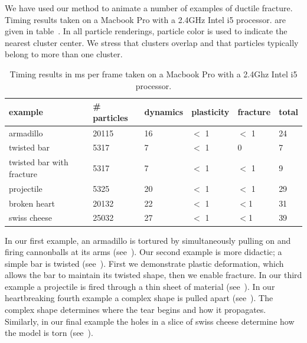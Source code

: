 \documentclass[review]{acmsiggraph}
\begin{document}
We have used our method to animate a number of examples of ductile fracture.  Timing results
taken on a Macbook Pro with a 2.4GHz Intel i5 processor.
are given in table~.
In all particle renderings, particle color is used to indicate the nearest cluster center.  
We stress that clusters overlap and that particles typically belong to more than one cluster.

\begin{table}
\begin{center}
\caption{Timing results in ms per frame taken on a Macbook Pro with a 2.4Ghz Intel i5 processor.}
\label{table:timing}
\begin{tabular}{|l|l|l|l|l|l|}
\hline
example & \# particles & dynamics & plasticity & fracture & total\\
\hline
armadillo & 20115 & 16  & $<$ 1 & $<$ 1 & 24\\
twisted bar & 5317 & 7 & $<$ 1  & 0 & 7\\
twisted bar with fracture & 5317 & 7  & $<$ 1 & $<$ 1 & 9 \\
projectile & 5325 & 20 & $<$ 1 & $<$ 1 & 29\\
broken heart & 20132 & 22 & $<$ 1 & $<$1 & 31\\
swiss cheese & 25032 & 27 & $<$ 1 & $<$1 & 39 \\
\hline
\end{tabular}
\end{center}
\end{table}

In our first example, an armadillo is tortured by simultaneously pulling on and firing
cannonballs at its arms (see~).
Our second example is more didactic; a simple bar is twisted (see~).  First we demonstrate 
plastic deformation, which allows the bar to maintain its twisted shape, then we enable fracture. 
In our third example a projectile is fired through a thin sheet of material (see~).  
In our heartbreaking fourth example a complex shape is pulled apart (see~).  The complex shape determines
where the tear begins and how it propagates.  Similarly, in our final example the holes in a 
slice of swiss cheese determine how the model is torn (see~).


\end{document}
